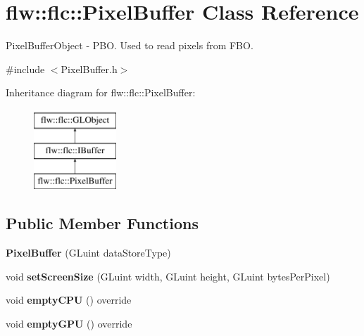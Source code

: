 \hypertarget{classflw_1_1flc_1_1PixelBuffer}{}\section{flw\+:\+:flc\+:\+:Pixel\+Buffer Class Reference}
\label{classflw_1_1flc_1_1PixelBuffer}


Pixel\+Buffer\+Object -\/ P\+BO. Used to read pixels from F\+BO.  




{\ttfamily \#include $<$Pixel\+Buffer.\+h$>$}

Inheritance diagram for flw\+:\+:flc\+:\+:Pixel\+Buffer\+:\begin{figure}[H]
\begin{center}
\leavevmode
\includegraphics[height=3.000000cm]{classflw_1_1flc_1_1PixelBuffer}
\end{center}
\end{figure}
\subsection*{Public Member Functions}
\begin{DoxyCompactItemize}
\item 
{\bfseries Pixel\+Buffer} (G\+Luint data\+Store\+Type)\hypertarget{classflw_1_1flc_1_1PixelBuffer_a5408f6228db71f4c3a96a58cd7a3341a}{}\label{classflw_1_1flc_1_1PixelBuffer_a5408f6228db71f4c3a96a58cd7a3341a}

\item 
void {\bfseries set\+Screen\+Size} (G\+Luint width, G\+Luint height, G\+Luint bytes\+Per\+Pixel)\hypertarget{classflw_1_1flc_1_1PixelBuffer_a7371cbff9e12369b1510475aa88f5363}{}\label{classflw_1_1flc_1_1PixelBuffer_a7371cbff9e12369b1510475aa88f5363}

\item 
void {\bfseries empty\+C\+PU} () override\hypertarget{classflw_1_1flc_1_1PixelBuffer_a759e4edc39475344ede04e85d5eed2f0}{}\label{classflw_1_1flc_1_1PixelBuffer_a759e4edc39475344ede04e85d5eed2f0}

\item 
void {\bfseries empty\+G\+PU} () override\hypertarget{classflw_1_1flc_1_1PixelBuffer_afdf3b9b874d0c2abf9f5883305ec8c47}{}\label{classflw_1_1flc_1_1PixelBuffer_afdf3b9b874d0c2abf9f5883305ec8c47}

\end{DoxyCompactItemize}
